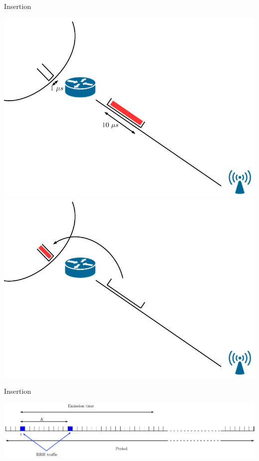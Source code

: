 \documentclass[10 pt]{beamer}
\begin{document}
\begin{frame}{Insertion}


\begin{center}
\includegraphics[scale=0.4]{slot1.pdf}
\hspace{1cm}
\includegraphics[scale=0.4]{slot2.pdf}

\end{center}

\end{frame}


\begin{frame}{Insertion}


\begin{center}
\includegraphics[scale=0.5]{emission_antenna.pdf}

\end{center}

\end{frame}
\end{document}
